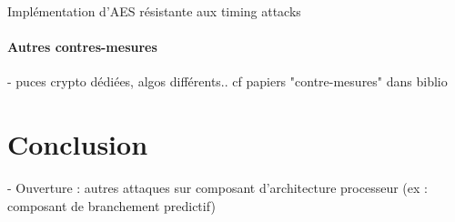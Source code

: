 \documentclass[a4paper,11pt]{article}
\begin{document}
Implémentation d'AES résistante aux timing attacks~\cite{kasper2009faster} %

\paragraph{Autres contres-mesures}
- puces crypto dédiées, algos différents.. cf papiers "contre-mesures" dans biblio %


\section*{Conclusion}

- Ouverture : autres attaques sur composant d'architecture processeur (ex :
  composant de branchement predictif)

\newpage
\nocite{*}


\end{document}
